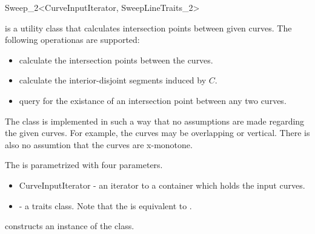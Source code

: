 
\ccRefPageBegin



\begin{ccRefClass}{Sweep_2<CurveInputIterator, SweepLineTraits_2>}
\label{SL_sec:sl2}
    
\ccDefinition
     is a utility class that calculates 
    intersection
    points between given curves. The following operationas are supported:

\begin{itemize}
\item calculate the intersection points between the curves.
\item calculate the interior-disjoint segments induced by $C$.
\item query for the existance of an intersection point between any two curves.
\end{itemize}

The  class is implemented in such a way that no
assumptions are made regarding the given curves. For example, the curves may
be overlapping or vertical. There is also no assumtion that the curves are
x-monotone.

The  is parametrized with four parameters. 
\begin{itemize}
\item CurveInputIterator - an iterator to a container which holds the input 
      curves.
\item {} - a traits class. Note that the 
       is equivalent to 
.
\end{itemize}



\ccCreation
    
   {constructs an instance of the  class.}
    

\end{ccRefClass}
